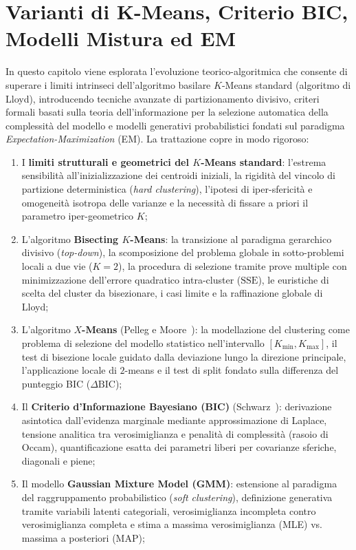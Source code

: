 \chapter{Varianti di K-Means, Criterio BIC, Modelli Mistura ed EM}
\label{chap:dm-kmeans-variants-bic-em}

In questo capitolo viene esplorata l'evoluzione teorico-algoritmica che consente di superare i limiti intrinseci dell'algoritmo basilare $K$-Means standard (algoritmo di Lloyd), introducendo tecniche avanzate di partizionamento divisivo, criteri formali basati sulla teoria dell'informazione per la selezione automatica della complessità del modello e modelli generativi probabilistici fondati sul paradigma \textit{Expectation-Maximization} (EM).
La trattazione copre in modo rigoroso:
\begin{enumerate}[noitemsep]
    \item I \textbf{limiti strutturali e geometrici del $K$-Means standard}: l'estrema sensibilità all'inizializzazione dei centroidi iniziali, la rigidità del vincolo di partizione deterministica (\textit{hard clustering}), l'ipotesi di iper-sfericità e omogeneità isotropa delle varianze e la necessità di fissare a priori il parametro iper-geometrico $K$;
    \item L'algoritmo \textbf{Bisecting $K$-Means}: la transizione al paradigma gerarchico divisivo (\textit{top-down}), la scomposizione del problema globale in sotto-problemi locali a due vie ($K=2$), la procedura di selezione tramite prove multiple con minimizzazione dell'errore quadratico intra-cluster ($\mathrm{SSE}$), le euristiche di scelta del cluster da bisezionare, i casi limite e la raffinazione globale di Lloyd;
    \item L'algoritmo \textbf{$X$-Means} (Pelleg e Moore~\cite{pelleg2000}): la modellazione del clustering come problema di selezione del modello statistico nell'intervallo $[K_{\min}, K_{\max}]$, il test di bisezione locale guidato dalla deviazione lungo la direzione principale, l'applicazione locale di $2$-means e il test di split fondato sulla differenza del punteggio BIC ($\Delta\mathrm{BIC}$);
    \item Il \textbf{Criterio d'Informazione Bayesiano (BIC)} (Schwarz~\cite{schwarz1978}): derivazione asintotica dall'evidenza marginale mediante approssimazione di Laplace, tensione analitica tra verosimiglianza e penalità di complessità (rasoio di Occam), quantificazione esatta dei parametri liberi per covarianze sferiche, diagonali e piene;
    \item Il modello \textbf{Gaussian Mixture Model (GMM)}: estensione al paradigma del raggruppamento probabilistico (\textit{soft clustering}), definizione generativa tramite variabili latenti categoriali, verosimiglianza incompleta contro verosimiglianza completa e stima a massima verosimiglianza (MLE) vs. massima a posteriori (MAP);

\end{enumerate}
